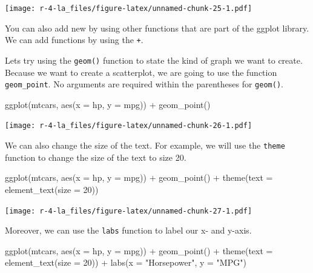 \documentclass[
]{book}
\newenvironment{Shaded}{\begin{snugshade}}{\end{snugshade}}
\newcommand{\AttributeTok}[1]{\textcolor[rgb]{0.77,0.63,0.00}{#1}}
\newcommand{\DecValTok}[1]{\textcolor[rgb]{0.00,0.00,0.81}{#1}}
\newcommand{\FunctionTok}[1]{\textcolor[rgb]{0.00,0.00,0.00}{#1}}
\newcommand{\NormalTok}[1]{#1}
\newcommand{\SpecialCharTok}[1]{\textcolor[rgb]{0.00,0.00,0.00}{#1}}
\newcommand{\StringTok}[1]{\textcolor[rgb]{0.31,0.60,0.02}{#1}}
\begin{document}
\texttt{[image: r-4-la\_files/figure-latex/unnamed-chunk-25-1.pdf]}

You can also add new by using other functions that are part of the ggplot library. We can add functions by using the \texttt{+}.

Lets try using the \texttt{geom()} function to state the kind of graph we want to create. Because we want to create a scatterplot, we are going to use the function \texttt{geom\_point}. No arguments are required within the parentheses for \texttt{geom()}.

\begin{Shaded}
\begin{Highlighting}[]
\FunctionTok{ggplot}\NormalTok{(mtcars, }\FunctionTok{aes}\NormalTok{(}\AttributeTok{x =}\NormalTok{ hp, }\AttributeTok{y =}\NormalTok{ mpg)) }\SpecialCharTok{+} 
      \FunctionTok{geom\_point}\NormalTok{()}
\end{Highlighting}
\end{Shaded}

\texttt{[image: r-4-la\_files/figure-latex/unnamed-chunk-26-1.pdf]}

We can also change the size of the text. For example, we will use the \texttt{theme} function to change the size of the text to size 20.

\begin{Shaded}
\begin{Highlighting}[]
\FunctionTok{ggplot}\NormalTok{(mtcars, }\FunctionTok{aes}\NormalTok{(}\AttributeTok{x =}\NormalTok{ hp, }\AttributeTok{y =}\NormalTok{ mpg)) }\SpecialCharTok{+} 
      \FunctionTok{geom\_point}\NormalTok{() }\SpecialCharTok{+} 
      \FunctionTok{theme}\NormalTok{(}\AttributeTok{text =} \FunctionTok{element\_text}\NormalTok{(}\AttributeTok{size =} \DecValTok{20}\NormalTok{))}
\end{Highlighting}
\end{Shaded}

\texttt{[image: r-4-la\_files/figure-latex/unnamed-chunk-27-1.pdf]}

Moreover, we can use the \texttt{labs} function to label our x- and y-axis.

\begin{Shaded}
\begin{Highlighting}[]
\FunctionTok{ggplot}\NormalTok{(mtcars, }\FunctionTok{aes}\NormalTok{(}\AttributeTok{x =}\NormalTok{ hp, }\AttributeTok{y =}\NormalTok{ mpg)) }\SpecialCharTok{+} 
      \FunctionTok{geom\_point}\NormalTok{() }\SpecialCharTok{+} 
      \FunctionTok{theme}\NormalTok{(}\AttributeTok{text =} \FunctionTok{element\_text}\NormalTok{(}\AttributeTok{size =} \DecValTok{20}\NormalTok{)) }\SpecialCharTok{+} 
      \FunctionTok{labs}\NormalTok{(}\AttributeTok{x =} \StringTok{"Horsepower"}\NormalTok{, }\AttributeTok{y =} \StringTok{"MPG"}\NormalTok{)}
\end{Highlighting}
\end{Shaded}
\end{document}
